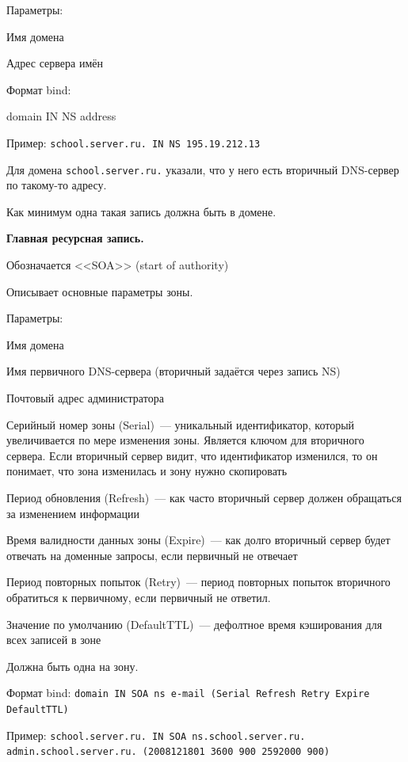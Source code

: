 Параметры:
\begin{MyItemize}
    \item Имя домена
    \item Адрес сервера имён
\end{MyItemize}
Формат bind:
\begin{MyItemize}
    \item domain IN NS address
\end{MyItemize}
Пример: {\tt school.server.ru. IN NS 195.19.212.13}

Для домена {\tt school.server.ru.} указали, что у него есть вторичный DNS-сервер по такому-то адресу.

Как минимум одна такая запись должна быть в домене.

 {\bf Главная ресурсная запись.}

 Обозначается <<SOA>> (start of authority)

 Описывает основные параметры зоны.

 Параметры:
 \begin{MyItemize}
    \item Имя домена
    \item Имя первичного DNS-сервера (вторичный задаётся через запись NS)
    \item Почтовый адрес администратора
    \item Серийный номер зоны (Serial)~--- уникальный идентификатор, который увеличивается по мере изменения зоны. Является ключом для вторичного сервера. Если вторичный сервер видит, что идентификатор изменился, то он понимает, что зона изменилась и зону нужно скопировать 
    \item Период обновления (Refresh)~--- как часто вторичный сервер должен обращаться за изменением информации
    \item Время валидности данных зоны (Expire)~--- как долго вторичный сервер будет отвечать на доменные запросы, если первичный не отвечает
    \item Период повторных попыток (Retry)~--- период повторных попыток вторичного обратиться к первичному, если первичный не ответил.
    \item Значение по умолчанию (DefaultTTL)~--- дефолтное время кэширования для всех записей в зоне
\end{MyItemize}

Должна быть одна на зону.

Формат bind: {\tt domain IN SOA ns e-mail (Serial Refresh Retry Expire DefaultTTL)}

Пример: {\tt school.server.ru. IN SOA ns.school.server.ru. admin.school.server.ru. (2008121801 3600 900 2592000 900)}

